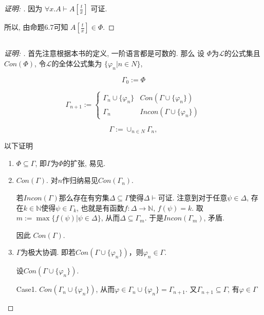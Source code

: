\documentclass{article}
\begin{document}
\begin{CJK*}{UTF8}{gbsn}
\begin{proof}[\emph{证明: }]
因为 $\forall x. A \vdash A [\frac{t}{x}]$ 可证. 

所以, 由命题6.7可知 $A [\frac{t}{x}]\in \Phi$. 
\end{proof}

\begin{samepage}
\section{}
\begin{proof}[\emph{证明: }]

首先注意根据本书的定义, 一阶语言都是可数的. 那么
设 $\Phi$为$\mathscr{L}$的公式集且$Con(\Phi)$, 
令$\mathscr{L}$的全体公式集为 $\{\varphi_n | n \in N\}$,

$$\Gamma_0 := \Phi$$

\begin{equation*}
\Gamma_{n+1} := \left\{ {\begin{array}{*{20}{c}}
{\Gamma_n \cup \{\varphi_n\}}&{Con (\Gamma\cup \{\varphi_n\})}\\
\Gamma_n&{Incon ( \Gamma\cup \{\varphi_n\})}
\end{array}} \right.
\end{equation*}

$$\Gamma := \cup_{n\in N} \Gamma_n,$$

以下证明
\begin{enumerate}[(1)]

	\item $\Phi \subseteq \Gamma$, 即$\Gamma$为$\Phi$的扩张, 易见. 

	\item $Con(\Gamma)$. 对$n$作归纳易见$Con(\Gamma_n)$. 

若$Incon(\Gamma)$那么存在有穷集$\Delta \subseteq \Gamma$使得$\Delta \vdash$可证. 注意到对于任意$\psi \in \Delta$, 存在$k\in \mathbb{N}$使得$\psi \in \Gamma_k$, 也就是有函数$f : \Delta \rightarrow \mathbb{N}$, $f(\psi) = k$. 取$m := \max\{f(\psi)|\psi \in \Delta\}$, 从而$\Delta \subseteq \Gamma_{m}$. 于是$Incon(\Gamma_{m})$, 矛盾. 


 因此 $Con(\Gamma)$.

	\item $\Gamma$为极大协调. 即若$Con(\Gamma \cup \{\varphi_n\})$，则$\varphi_n \in \Gamma$.

设$Con(\Gamma \cup \{\varphi_n\})$.

Case1. $Con(\Gamma_n \cup \{\varphi_n\})$, 从而$\varphi \in \Gamma_n \cup \{\varphi_n\} =\Gamma_{n+1} $. 又$\Gamma_{n+1} \subseteq \Gamma$, 有$\varphi \in \Gamma$


\end{enumerate}
\end{proof}
\end{samepage}
\end{CJK*}
\end{document}
